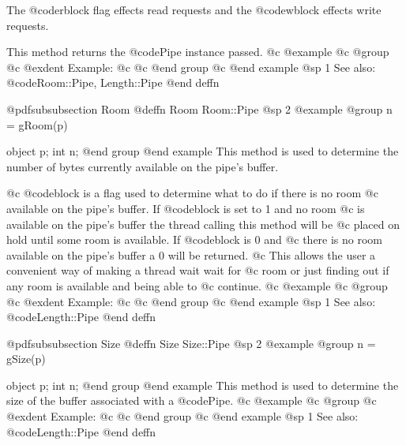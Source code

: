 The @code{rblock} flag effects read requests and the @code{wblock}
effects write requests.

This method returns the @code{Pipe} instance passed.
@c @example
@c @group
@c @exdent Example:
@c 
@c @end group
@c @end example
@sp 1
See also:  @code{Room::Pipe, Length::Pipe}
@end deffn









@pdfsubsubsection {Room}
@deffn {Room} Room::Pipe
@sp 2
@example
@group
n = gRoom(p)

object  p;
int     n;
@end group
@end example
This method is used to determine the number of bytes currently available
on the pipe's buffer.

@c @code{block} is a flag used to determine what to do if there is no room
@c available on the pipe's buffer.  If @code{block} is set to 1 and no room
@c is available on the pipe's buffer the thread calling this method will be
@c placed on hold until some room is available.  If @code{block} is 0 and
@c there is no room available on the pipe's buffer a 0 will be returned.
@c This allows the user a convenient way of making a thread wait wait for
@c room or just finding out if any room is available and being able to
@c continue.
@c @example
@c @group
@c @exdent Example:
@c 
@c @end group
@c @end example
@sp 1
See also:  @code{Length::Pipe}
@end deffn












@pdfsubsubsection {Size}
@deffn {Size} Size::Pipe
@sp 2
@example
@group
n = gSize(p)

object  p;
int     n;
@end group
@end example
This method is used to determine the size of the buffer associated with a
@code{Pipe}.
@c @example
@c @group
@c @exdent Example:
@c 
@c @end group
@c @end example
@sp 1
See also:  @code{Length::Pipe}
@end deffn
















